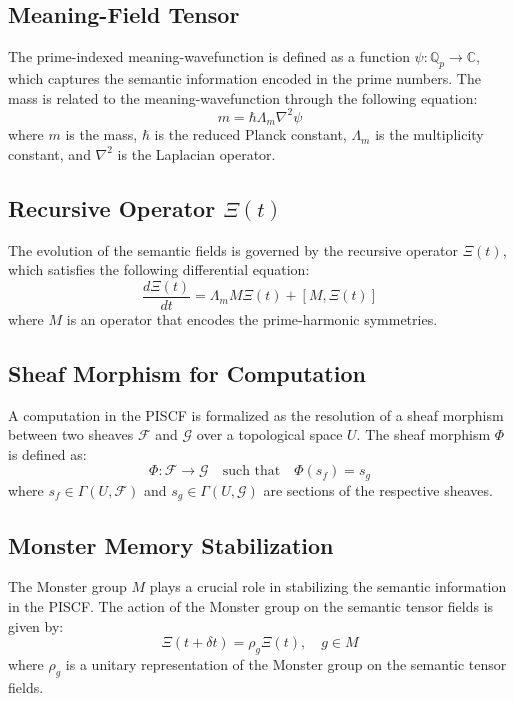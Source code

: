 \documentclass{article}
\theoremstyle{plain}
\begin{document}
\subsection{Meaning-Field Tensor}

The prime-indexed meaning-wavefunction is defined as a function $\psi : \mathbb{Q}_p \to \mathbb{C}$, which captures the semantic information encoded in the prime numbers. The mass is related to the meaning-wavefunction through the following equation:
\begin{equation}
m = \hbar \Lambda_m \nabla^2 \psi
\end{equation}
where $m$ is the mass, $\hbar$ is the reduced Planck constant, $\Lambda_m$ is the multiplicity constant, and $\nabla^2$ is the Laplacian operator.

\subsection{Recursive Operator $\Xi(t)$}

The evolution of the semantic fields is governed by the recursive operator $\Xi(t)$, which satisfies the following differential equation:
\begin{equation}
\frac{d\Xi(t)}{dt} = \Lambda_m M \Xi(t) + [M, \Xi(t)]
\end{equation}
where $M$ is an operator that encodes the prime-harmonic symmetries.

\subsection{Sheaf Morphism for Computation}

A computation in the PISCF is formalized as the resolution of a sheaf morphism between two sheaves $\mathcal{F}$ and $\mathcal{G}$ over a topological space $U$. The sheaf morphism $\Phi$ is defined as:
\begin{equation}
\Phi : \mathcal{F} \to \mathcal{G} \quad \text{such that} \quad \Phi(s_f) = s_g
\end{equation}
where $s_f \in \Gamma(U, \mathcal{F})$ and $s_g \in \Gamma(U, \mathcal{G})$ are sections of the respective sheaves.

\subsection{Monster Memory Stabilization}

The Monster group $M$ plays a crucial role in stabilizing the semantic information in the PISCF. The action of the Monster group on the semantic tensor fields is given by:
\begin{equation}
\Xi(t+\delta t) = \rho_g \Xi(t), \quad g \in M
\end{equation}
where $\rho_g$ is a unitary representation of the Monster group on the semantic tensor fields.
\end{document}
